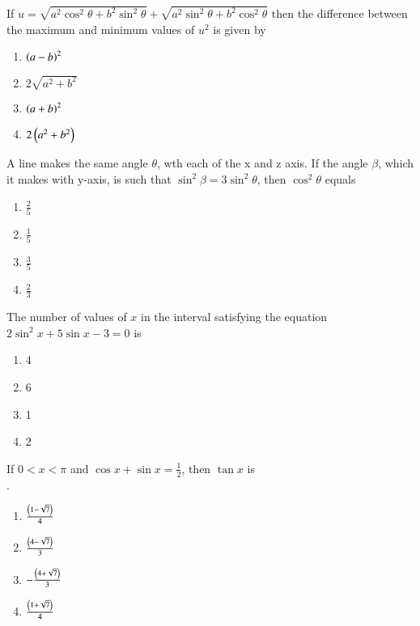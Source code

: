 \item If
$u=\sqrt{a^2 \cos^2 \theta+b^2 \sin^2 \theta}+\sqrt{a^2 \sin^2 \theta+b^2 \cos^2 \theta}$
then the difference between the  maximum and minimum values of $u^2$ is given by \hfill{}
\begin{multicols}{2} 
\begin{enumerate}
\item $\left(a-b\right)^2$
\item $2\sqrt{a^2 +b^2}$
\columnbreak
\item $\left(a+b\right)^2$
\item $2\left(a^2 +b^2\right)$
\end{enumerate} 
\end{multicols}
\item A line makes the same angle $\theta$, wth each of the x and z axis. 
If the angle $\beta$, which it makes with y-axis, is such that
$\sin^2 \beta=3\sin^2 \theta$, then $\cos^2 \theta$ equals \hfill{}
\begin{multicols}{2} 
\begin{enumerate}
\item $\frac{2}{5}$
\item $\frac{1}{5}$
\columnbreak
\item $\frac{3}{5}$
\item $\frac{2}{3}$
\end{enumerate} 
\end{multicols}
\item The number of values of $x$ in the interval  satisfying the equation 
\\$2\sin^2 x+5\sin x-3=0$ is \hfill{}
\begin{multicols}{4}
\begin{enumerate}
\item 4
\columnbreak
\item 6
\columnbreak
\item 1
\columnbreak
\item 2
\end{enumerate} 
\end{multicols}
\item If $0<x<\pi$ and $\cos x+\sin x=\frac{1}{2}$, then $\tan x$ is 
\\.\hfill{}
\begin{multicols}{2} 
\begin{enumerate}
\item $\frac{\left(1-\sqrt{7}\right)}{4}$
\item $\frac{\left(4-\sqrt{7}\right)}{3}$
\columnbreak
\item $-\frac{\left(4+\sqrt{7}\right)}{3}$
\item $\frac{\left(1+\sqrt{7}\right)}{4}$
\end{enumerate} 
\end{multicols}
